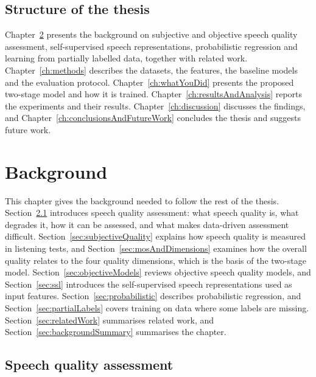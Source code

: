 \documentclass[
english,                 %
bibtex,                  %
includeExtraAbstracts, %
]{kththesis}
\numberwithin{listing}{chapter}
\begin{document}
\section{Structure of the thesis}

Chapter~\ref{ch:background} presents the background on subjective and objective speech quality assessment, self-supervised speech representations, probabilistic regression and learning from partially labelled data, together with related work. Chapter~\ref{ch:methods} describes the datasets, the features, the baseline models and the evaluation protocol. Chapter~\ref{ch:whatYouDid} presents the proposed two-stage model and how it is trained. Chapter~\ref{ch:resultsAndAnalysis} reports the experiments and their results. Chapter~\ref{ch:discussion} discusses the findings, and Chapter~\ref{ch:conclusionsAndFutureWork} concludes the thesis and suggests future work.

\cleardoublepage
\chapter{Background}
\label{ch:background}
\providecommand{\vect}[1]{\ifdefined\symbf\symbf{#1}\else\bm{#1}\fi}

This chapter gives the background needed to follow the rest of the thesis. Section~\ref{sec:sqa} introduces speech quality assessment: what speech quality is, what degrades it, how it can be assessed, and what makes data-driven assessment difficult. Section~\ref{sec:subjectiveQuality} explains how speech quality is measured in listening tests, and Section~\ref{sec:mosAndDimensions} examines how the overall quality relates to the four quality dimensions, which is the basis of the two-stage model. Section~\ref{sec:objectiveModels} reviews objective speech quality models, and Section~\ref{sec:ssl} introduces the self-supervised speech representations used as input features. Section~\ref{sec:probabilistic} describes probabilistic regression, and Section~\ref{sec:partialLabels} covers training on data where some labels are missing. Section~\ref{sec:relatedWork} summarises related work, and Section~\ref{sec:backgroundSummary} summarises the chapter.

\section{Speech quality assessment}
\label{sec:sqa}
\end{document}
